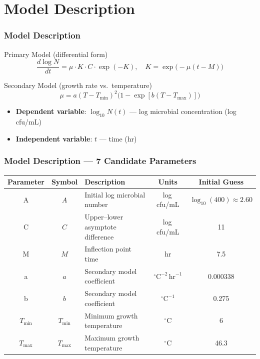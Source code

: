 \documentclass[10pt,aspectratio=169]{beamer}
\begin{document}
\section{Model Description}
\begin{frame}
	\frametitle{Model Description}
	\begin{block}{Primary Model (differential form)}
		\begin{equation}
			\frac{d\log N}{dt} = \mu \cdot K \cdot C \cdot \exp(-K), \quad K = \exp\!\bigl(-\mu(t - M)\bigr)
		\end{equation}
	\end{block}
	\begin{block}{Secondary Model (growth rate vs.\ temperature)}
		\begin{equation}
			\mu = a(T - T_{\min})^2 \bigl(1 - \exp[b(T - T_{\max})]\bigr)
		\end{equation}
	\end{block}
	\vspace{0.3em}
	\begin{itemize}
		\item \textbf{Dependent variable}: $\log_{10} N(t)$ — log microbial concentration (log\,cfu/mL)
		\item \textbf{Independent variable}: $t$ — time (hr)
	\end{itemize}
\end{frame}

\begin{frame}
	\frametitle{Model Description — 7 Candidate Parameters}
	\begin{table}[ht]
		\centering
		\footnotesize
		\begin{tabular}{cclcc}
			\toprule
			Parameter & Symbol & Description & Units & Initial Guess \\
			\midrule
			A & $A$ & Initial log microbial number & log\,cfu/mL & $\log_{10}(400)\approx 2.60$ \\
			C & $C$ & Upper--lower asymptote difference & log\,cfu/mL & 11 \\
			M & $M$ & Inflection point time & hr & 7.5 \\
			a & $a$ & Secondary model coefficient & ${}^{\circ}\text{C}^{-2}\,\text{hr}^{-1}$ & 0.000338 \\
			b & $b$ & Secondary model coefficient & ${}^{\circ}\text{C}^{-1}$ & 0.275 \\
			$T_{\min}$ & $T_{\min}$ & Minimum growth temperature & ${}^{\circ}\text{C}$ & 6 \\
			$T_{\max}$ & $T_{\max}$ & Maximum growth temperature & ${}^{\circ}\text{C}$ & 46.3 \\
			\bottomrule
		\end{tabular}
	\end{table}
\end{frame}
\end{document}
